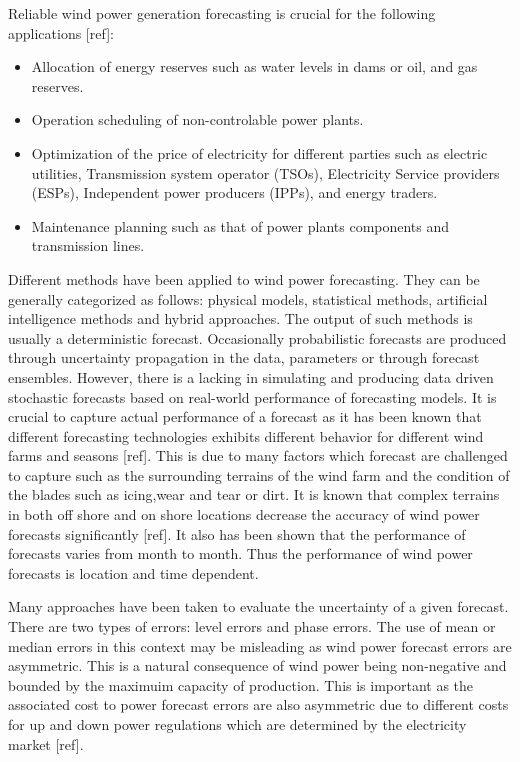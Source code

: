 \documentclass[10pt,twocolumn,letterpaper]{article}
\begin{document}
Reliable wind power generation forecasting is crucial for the following applications [ref]:
\begin{itemize}
\item Allocation of energy reserves such as water levels in dams or oil, and gas reserves.
\item Operation scheduling of non-controlable power plants.
\item Optimization of the price of electricity for different parties such as electric utilities, Transmission system operator (TSOs), Electricity Service providers (ESPs), Independent power producers (IPPs), and energy traders.
\item Maintenance planning such as that of power plants components and transmission lines.

\end{itemize}

Different methods have been applied to wind power forecasting. They can be generally categorized as follows: physical models, statistical methods, artificial intelligence methods and hybrid approaches. The output of such methods is usually a deterministic forecast. Occasionally probabilistic forecasts are produced through uncertainty propagation in the data, parameters or through forecast ensembles. However, there is a lacking in simulating and producing data driven stochastic forecasts based on real-world performance of forecasting models. It is crucial to capture actual performance of a forecast as it has been known that different forecasting technologies exhibits different behavior for different wind farms and seasons [ref]. This is due to many factors which forecast are challenged to capture such as the surrounding terrains of the wind farm and the condition of the blades such as icing,wear and tear or dirt. It is known that complex terrains in both off shore and on shore locations decrease the accuracy of wind power forecasts significantly [ref]. It also has been shown that the performance of forecasts varies from month to month. Thus the performance of wind power forecasts is location and time dependent.

Many approaches have been taken to evaluate the uncertainty of a given forecast. There are two types of errors: level errors and phase errors. The use of mean or median errors in this context may be misleading as wind power forecast errors are asymmetric. This is a natural consequence of wind power being non-negative and bounded by the maximuim capacity of production. This is important as the associated cost to power forecast errors are also asymmetric due to different costs for up and down  power regulations which are determined by the electricity market [ref].
\end{document}
